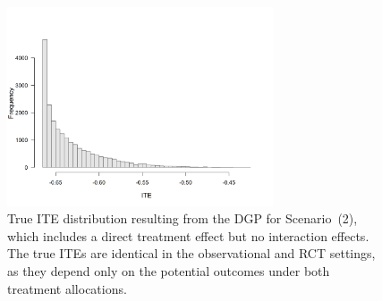 % 



\begin{figure}[htbp]
\centering
\includegraphics[width=0.7\textwidth]{img/results/observ_scenario2_ite_distribution_dgp.png}
\caption{True ITE distribution resulting from the DGP for Scenario~(2), which includes a direct treatment effect but no interaction effects. The true ITEs are identical in the observational and RCT settings, as they depend only on the potential outcomes under both treatment allocations.}
\label{fig:scenario2_ite_distribution_dgp}
\end{figure}



